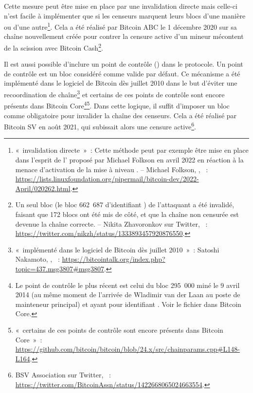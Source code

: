 Cette mesure peut être mise en place par une invalidation directe mais celle-ci n'est facile à implémenter que si les censeurs marquent leurs blocs d'une manière ou d'une autre\footnote{«~invalidation directe~»~: Cette méthode peut par exemple être mise en place dans l'esprit de l' proposé par Michael Folkson en avril 2022 en réaction à la menace d'activation de la mise à niveau . -- Michael Folkson, , ~: \url{https://lists.linuxfoundation.org/pipermail/bitcoin-dev/2022-April/020262.html}.}. Cela a été réalisé par Bitcoin ABC le 1\ier{} décembre 2020 sur sa chaîne nouvellement créée pour contrer la censure active d'un mineur mécontent de la scission avec Bitcoin Cash\footnote{Un seul bloc (le bloc 662~687 d'identifiant ) de l'attaquant a été invalidé, faisant que 172 blocs ont été mis de côté, et que la chaîne non censurée est devenue la chaîne correcte. -- Nikita Zhavoronkov sur Twitter, ~: \url{https://twitter.com/nikzh/status/1333893457920876550}.}.

Il est aussi possible d'inclure un point de contrôle () dans le protocole. Un point de contrôle est un bloc considéré comme valide par défaut. Ce mécanisme a été implémenté dans le logiciel de Bitcoin dès juillet 2010 dans le but d'éviter une recoordination de chaîne\footnote{«~implémenté dans le logiciel de Bitcoin dès juillet 2010~»~: Satoshi Nakamoto, , ~: \url{https://bitcointalk.org/index.php?topic=437.msg3807\#msg3807}.} et certains de ces points de contrôle sont encore présents dans Bitcoin Core\footnote{Le point de contrôle le plus récent est celui du bloc 295~000 miné le 9 avril 2014 (au même moment de l'arrivée de Wladimir van der Laan au poste de mainteneur principal) et ayant pour identifiant . Voir le fichier  dans Bitcoin Core.}\footnote{«~certains de ces points de contrôle sont encore présents dans Bitcoin Core~»~: \url{https://github.com/bitcoin/bitcoin/blob/24.x/src/chainparams.cpp\#L148-L164}.}. Dans cette logique, il suffit d'imposer un bloc comme obligatoire pour invalider la chaîne des censeurs. Cela a été réalisé par Bitcoin SV en août 2021, qui subissait alors une censure active\footnote{BSV Association sur Twitter, ~: \url{https://twitter.com/BitcoinAssn/status/1422668065024663554}.}.

